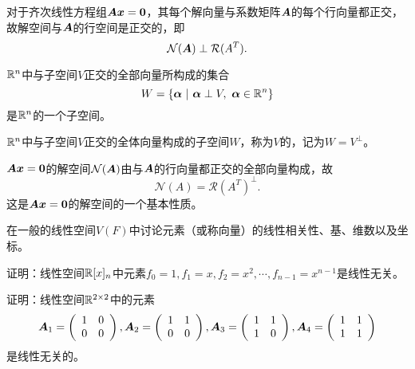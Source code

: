 \begin{frame}

  \begin{li}
    对于齐次线性方程组$\MA\vx=\M0$，其每个解向量与系数矩阵$\boldsymbol{A}$的每个行向量都正交，故解空间与$\boldsymbol{A}$的行空间是正交的，即
    $$
    \mathcal N(\boldsymbol{A}) \perp \mathcal R(A^T).
    $$
  \end{li}

\end{frame}

\begin{frame}
  \begin{dingli}
    $\mathbb R^n$中与子空间$V$正交的全部向量所构成的集合
    $$
    W=\{\boldsymbol{\alpha} ~|~ \boldsymbol{\alpha} \perp V, ~ \boldsymbol{\alpha} \in \mathbb R^n \}
    $$
    是$\mathbb R^n$的一个子空间。
  \end{dingli}
\end{frame}

\begin{frame}
  \begin{dingyi}
    $\mathbb R^n$中与子空间$V$正交的全体向量构成的子空间$W$，称为$V$的，记为$W=V^\perp$。
  \end{dingyi}\vspace{.1in}

  \begin{li}
    $\MA \vx = \M0$的解空间$\mathcal N(\boldsymbol{A})$由与$\boldsymbol{A}$的行向量都正交的全部向量构成，故
    $$
    \mathcal N(A) = \mathcal R(A^T)^\perp. 
    $$
    这是$\MA \vx = \M0$的解空间的一个基本性质。
  \end{li}
\end{frame}


\begin{frame}
  在一般的线性空间$V(F)$中讨论元素（或称向量）的线性相关性、基、维数以及坐标。
\end{frame}

\begin{frame}

\begin{li}
证明：线性空间$\mathbb R[x]_n$中元素$f_0=1, f_1=x, f_2=x^2,\cdots,f_{n-1}=x^{n-1}$是线性无关。
\end{li} \vspace{.2in} 

\begin{li}
证明：线性空间$\mathbb R^{2\times 2}$中的元素
$$
\boldsymbol{A}_1=\left(\begin{array}{cc} 1&0\\0&0 \end{array}\right), 
\boldsymbol{A}_2=\left(\begin{array}{cc} 1&1\\0&0 \end{array}\right), 
\boldsymbol{A}_3=\left(\begin{array}{cc} 1&1\\1&0 \end{array}\right), 
\boldsymbol{A}_4=\left(\begin{array}{cc} 1&1\\1&1 \end{array}\right) 
$$
是线性无关的。
\end{li}
\end{frame}

